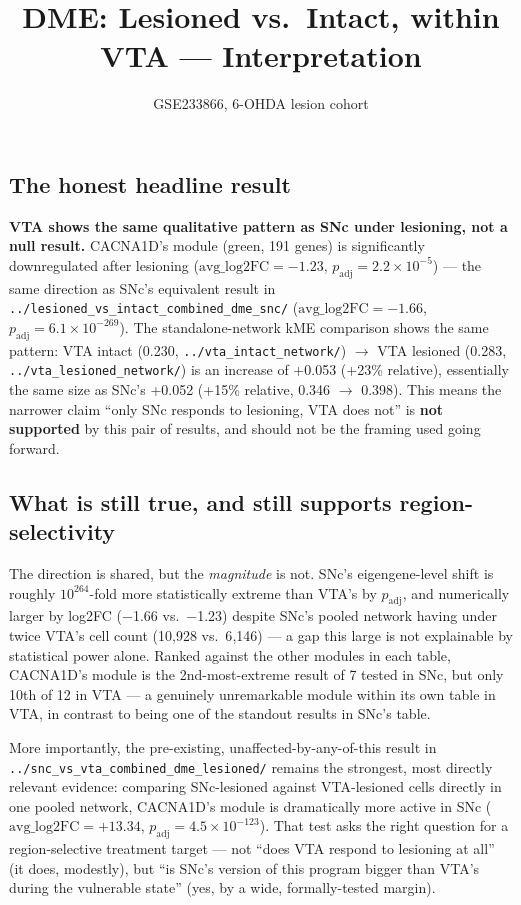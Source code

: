 \documentclass[11pt]{article}
\title{DME: Lesioned vs.\ Intact, within VTA --- Interpretation}
\author{GSE233866, 6-OHDA lesion cohort}
\date{}
\begin{document}
\maketitle

\subsection*{The honest headline result}

\textbf{VTA shows the same qualitative pattern as SNc under lesioning, not a null result.}
CACNA1D's module (green, 191 genes) is significantly downregulated after lesioning
($\mathrm{avg\_log2FC}=-1.23$, $p_{\mathrm{adj}}=2.2\times10^{-5}$) --- the same direction as
SNc's equivalent result in \texttt{../lesioned\_vs\_intact\_combined\_dme\_snc/}
($\mathrm{avg\_log2FC}=-1.66$, $p_{\mathrm{adj}}=6.1\times10^{-269}$). The standalone-network
kME comparison shows the same pattern: VTA intact (0.230, \texttt{../vta\_intact\_network/})
$\to$ VTA lesioned (0.283, \texttt{../vta\_lesioned\_network/}) is an increase of +0.053
(+23\% relative), essentially the same size as SNc's +0.052 (+15\% relative, 0.346 $\to$
0.398). This means the narrower claim ``only SNc responds to lesioning, VTA does not'' is
\textbf{not supported} by this pair of results, and should not be the framing used going
forward.

\subsection*{What is still true, and still supports region-selectivity}

The direction is shared, but the \emph{magnitude} is not. SNc's eigengene-level shift is
roughly $10^{264}$-fold more statistically extreme than VTA's by $p_{\mathrm{adj}}$, and
numerically larger by log2FC (−1.66 vs.\ −1.23) despite SNc's pooled network having under
twice VTA's cell count (10{,}928 vs.\ 6{,}146) --- a gap this large is not explainable by
statistical power alone. Ranked against the other modules in each table, CACNA1D's module is
the 2nd-most-extreme result of 7 tested in SNc, but only 10th of 12 in VTA --- a genuinely
unremarkable module within its own table in VTA, in contrast to being one of the standout
results in SNc's table.

More importantly, the pre-existing, unaffected-by-any-of-this result in
\texttt{../snc\_vs\_vta\_combined\_dme\_lesioned/} remains the strongest, most directly
relevant evidence: comparing SNc-lesioned against VTA-lesioned cells directly in one pooled
network, CACNA1D's module is dramatically more active in SNc
($\mathrm{avg\_log2FC}=+13.34$, $p_{\mathrm{adj}}=4.5\times10^{-123}$). That test asks the
right question for a region-selective treatment target --- not ``does VTA respond to
lesioning at all'' (it does, modestly), but ``is SNc's version of this program bigger than
VTA's during the vulnerable state'' (yes, by a wide, formally-tested margin).
\end{document}
